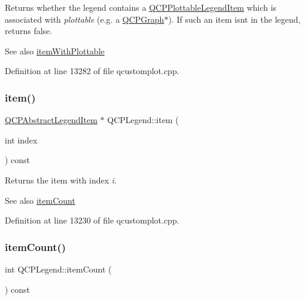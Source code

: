 Returns whether the legend contains a \hyperlink{class_q_c_p_plottable_legend_item}{Q\+C\+P\+Plottable\+Legend\+Item} which is associated with {\itshape plottable} (e.\+g. a \hyperlink{class_q_c_p_graph}{Q\+C\+P\+Graph}$\ast$). If such an item isn\textquotesingle{}t in the legend, returns false.

\begin{DoxySeeAlso}{See also}
\hyperlink{class_q_c_p_legend_a91e790002d8bf15a20628a8e8841e397}{item\+With\+Plottable} 
\end{DoxySeeAlso}


Definition at line 13282 of file qcustomplot.\+cpp.

\mbox{\label{class_q_c_p_legend_acfe9694c45104a3359d3806ed366fcf7}} 
\subsubsection{\texorpdfstring{item()}{item()}}
{\footnotesize\ttfamily \hyperlink{class_q_c_p_abstract_legend_item}{Q\+C\+P\+Abstract\+Legend\+Item} $\ast$ Q\+C\+P\+Legend\+::item (\begin{DoxyParamCaption}\item[{int}]{index }\end{DoxyParamCaption}) const}

Returns the item with index {\itshape i}.

\begin{DoxySeeAlso}{See also}
\hyperlink{class_q_c_p_legend_a57ab86ab8b2a3762d4c1455eb5452c88}{item\+Count} 
\end{DoxySeeAlso}


Definition at line 13230 of file qcustomplot.\+cpp.

\mbox{\label{class_q_c_p_legend_a57ab86ab8b2a3762d4c1455eb5452c88}} 
\subsubsection{\texorpdfstring{item\+Count()}{itemCount()}}
{\footnotesize\ttfamily int Q\+C\+P\+Legend\+::item\+Count (\begin{DoxyParamCaption}{ }\end{DoxyParamCaption}) const}


